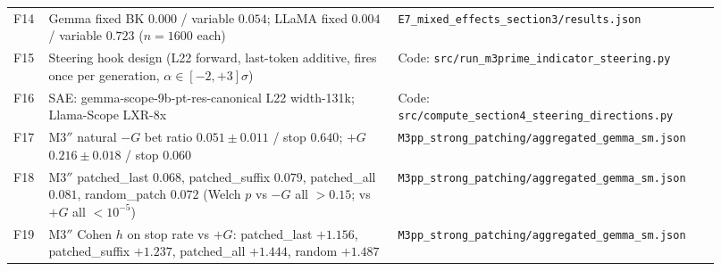 \documentclass[11pt,a4paper]{article}
\begin{document}
\begin{longtable}{p{0.04\linewidth} p{0.46\linewidth} p{0.42\linewidth}}
F14 & Gemma fixed BK $0.000$ / variable $0.054$; LLaMA fixed $0.004$ / variable $0.723$ ($n=1600$ each) & \texttt{E7\_mixed\_effects\_section3/results.json} \\
F15 & Steering hook design (L22 forward, last-token additive, fires once per generation, $\alpha \in [-2,+3]\sigma$) & Code: \texttt{src/run\_m3prime\_indicator\_steering.py} \\
F16 & SAE: gemma-scope-9b-pt-res-canonical L22 width-131k; Llama-Scope LXR-8x & Code: \texttt{src/compute\_section4\_steering\_directions.py} \\
F17 & M3$''$ natural $-G$ bet ratio $0.051 \pm 0.011$ / stop $0.640$; $+G$ $0.216 \pm 0.018$ / stop $0.060$ & \texttt{M3pp\_strong\_patching/aggregated\_gemma\_sm.json} \\
F18 & M3$''$ patched\_last $0.068$, patched\_suffix $0.079$, patched\_all $0.081$, random\_patch $0.072$ (Welch $p$ vs $-G$ all $> 0.15$; vs $+G$ all $< 10^{-5}$) & \texttt{M3pp\_strong\_patching/aggregated\_gemma\_sm.json} \\
F19 & M3$''$ Cohen $h$ on stop rate vs $+G$: patched\_last $+1.156$, patched\_suffix $+1.237$, patched\_all $+1.444$, random $+1.487$ & \texttt{M3pp\_strong\_patching/aggregated\_gemma\_sm.json} \\
\bottomrule
\end{longtable}
\end{document}
